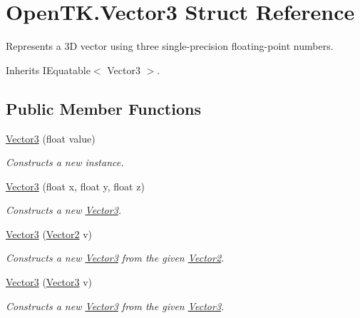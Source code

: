 \hypertarget{struct_open_t_k_1_1_vector3}{\section{Open\-T\-K.\-Vector3 Struct Reference}
\label{struct_open_t_k_1_1_vector3}
}


Represents a 3\-D vector using three single-\/precision floating-\/point numbers.  




Inherits I\-Equatable$<$ Vector3 $>$.

\subsection*{Public Member Functions}
\begin{DoxyCompactItemize}
\item 
\hyperlink{struct_open_t_k_1_1_vector3_a86a54f61c76e4b47a59fadfed93b990e}{Vector3} (float value)
\begin{DoxyCompactList}\small\item\em Constructs a new instance. \end{DoxyCompactList}\item 
\hyperlink{struct_open_t_k_1_1_vector3_ad97f4b09829953c6f0d3cb741acb50ee}{Vector3} (float x, float y, float z)
\begin{DoxyCompactList}\small\item\em Constructs a new \hyperlink{struct_open_t_k_1_1_vector3}{Vector3}. \end{DoxyCompactList}\item 
\hyperlink{struct_open_t_k_1_1_vector3_a72723b413384ca5c2b4d043fa9cd59c4}{Vector3} (\hyperlink{struct_open_t_k_1_1_vector2}{Vector2} v)
\begin{DoxyCompactList}\small\item\em Constructs a new \hyperlink{struct_open_t_k_1_1_vector3}{Vector3} from the given \hyperlink{struct_open_t_k_1_1_vector2}{Vector2}. \end{DoxyCompactList}\item 
\hyperlink{struct_open_t_k_1_1_vector3_a3c5a4ffa998c2d07e6b6861296c847b7}{Vector3} (\hyperlink{struct_open_t_k_1_1_vector3}{Vector3} v)
\begin{DoxyCompactList}\small\item\em Constructs a new \hyperlink{struct_open_t_k_1_1_vector3}{Vector3} from the given \hyperlink{struct_open_t_k_1_1_vector3}{Vector3}. \end{DoxyCompactList}\item 

\end{DoxyCompactItemize}
